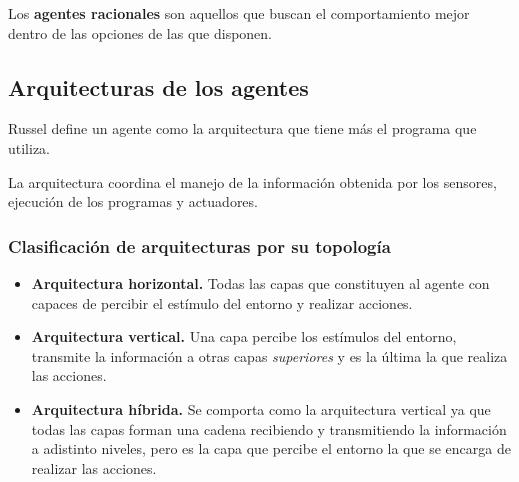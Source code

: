 \documentclass[12 pt, a4paper]{article}
\begin{document}
 Los \textbf{agentes racionales} son aquellos que buscan el comportamiento mejor dentro de las opciones de las que
 disponen. 

 \subsection{Arquitecturas de los agentes}  
Russel define un agente como la arquitectura que tiene más el programa que utiliza. 

La arquitectura coordina el manejo de la información obtenida por los sensores, ejecución de los programas y actuadores. 

\subsubsection*{Clasificación de arquitecturas por su topología}

\begin{itemize}
  \item \textbf{ Arquitectura horizontal.} Todas las capas que constituyen al agente con capaces
  de percibir el estímulo del entorno y realizar acciones. 

  \item \textbf{Arquitectura vertical.} Una capa percibe los estímulos del entorno, transmite la información a otras capas \textit{superiores}
  y es la última la que realiza las acciones. 

\item \textbf{Arquitectura híbrida.} Se comporta como la arquitectura vertical ya que todas las capas forman una cadena
recibiendo y transmitiendo la información a adistinto niveles, 
pero es la capa que percibe el entorno la que se encarga de realizar las acciones.

\end{itemize}
\end{document}
